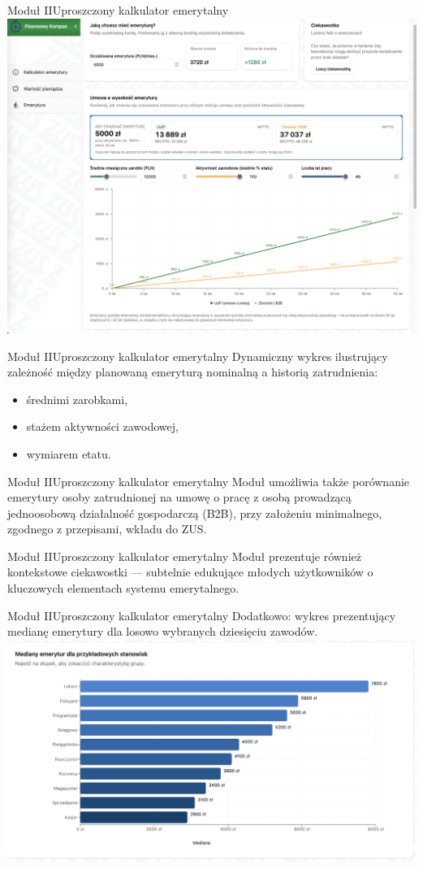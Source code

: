 \begin{frame}[t]{Moduł II}{Uproszczony kalkulator emerytalny}
  \includegraphics[width=.8\textwidth]{img/module_2_simple_pension_calculator}
\end{frame}

\begin{frame}[t]{Moduł II}{Uproszczony kalkulator emerytalny}
Dynamiczny wykres ilustrujący zależność między planowaną emeryturą nominalną a historią zatrudnienia:
\begin{itemize}
  \item średnimi zarobkami,
  \item stażem aktywności zawodowej,
  \item wymiarem etatu.
\end{itemize}
\end{frame}

\begin{frame}[t]{Moduł II}{Uproszczony kalkulator emerytalny}
Moduł umożliwia także porównanie emerytury osoby zatrudnionej na umowę o pracę
z osobą prowadzącą jednoosobową działalność gospodarczą (B2B),
przy założeniu minimalnego, zgodnego z przepisami, wkładu do ZUS.
\end{frame}

\begin{frame}[t]{Moduł II}{Uproszczony kalkulator emerytalny}
Moduł prezentuje również kontekstowe ciekawostki ---
subtelnie edukujące młodych użytkowników o kluczowych elementach systemu emerytalnego.
\end{frame}

\begin{frame}[t]{Moduł II}{Uproszczony kalkulator emerytalny}
Dodatkowo: wykres prezentujący medianę emerytury dla losowo wybranych
dziesięciu zawodów.
\\[2em]
\includegraphics[width=.8\textwidth]{img/module_2b_median_pensions}
\end{frame}

